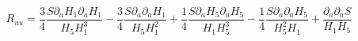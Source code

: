 \begin{equation}
R_{uu}=\frac{3}{4} \frac{S \partial_a H_1 \partial_a H_1}{H_5 H_1^3} - \frac{3}{4} \frac{S \partial_a \partial_a H_1}{H_5 H_1^2} +\frac{1}{4} \frac{S \partial_a H_5 \partial_a H_5}{H_1 H_5^3} -\frac{1}{4} \frac{S \partial_a \partial_a H_5}{H_5^2 H_1} + \frac{\partial_a \partial_a S}{H_1 H_5}
\end{equation} 
